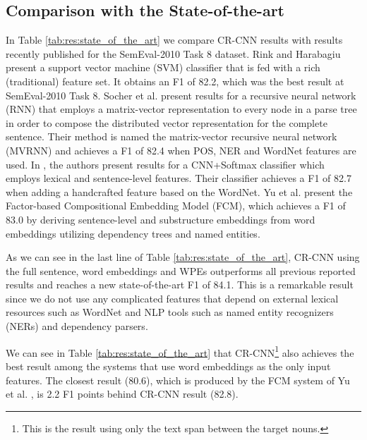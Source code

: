 \documentclass[11pt]{article}
\begin{document}
\subsection{Comparison with the State-of-the-art}
In Table \ref{tab:res:state_of_the_art} we compare CR-CNN results with results recently published for the SemEval-2010 Task 8 dataset.
Rink and Harabagiu  present a support vector machine (SVM) classifier that is fed with a rich (traditional) feature set. It obtains an F1 of 82.2, 
which was the best result at SemEval-2010 Task 8. 
Socher et al.  present results for a recursive neural network (RNN) that employs a matrix-vector representation to every node in a parse tree in order to compose the distributed vector representation for the complete sentence.
Their method is named the matrix-vector recursive neural network (MVRNN)
and achieves a F1 of 82.4 when POS, NER and WordNet features are used.
In \cite{zeng2014:coling},
the authors present results for a CNN+Softmax classifier which employs lexical and sentence-level features.
Their classifier achieves a F1 of 82.7 when adding a handcrafted feature based on the WordNet. 
Yu et al.  present the Factor-based Compositional Embedding Model (FCM),
which achieves a F1 of 83.0 by deriving sentence-level and substructure embeddings from word embeddings utilizing dependency trees and named entities.

As we can see in the last line of Table \ref{tab:res:state_of_the_art},
CR-CNN using the full sentence, word embeddings and WPEs outperforms all previous reported results and reaches a new state-of-the-art F1 of 84.1.
This is a remarkable result since we do not use any complicated features that depend on external lexical resources such as WordNet and NLP tools such as named entity recognizers (NERs) and dependency parsers.

We can see in Table \ref{tab:res:state_of_the_art} that CR-CNN\footnote{This is the result using only the text span between the target nouns.} also achieves the best result among the systems that use word embeddings as the only input features.
The closest result (80.6),
which is produced by the FCM system of Yu et al. ,
is 2.2 F1 points behind CR-CNN result (82.8).
\end{document}
